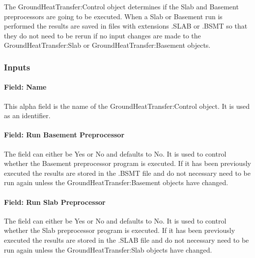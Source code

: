The GroundHeatTransfer:Control object determines if the Slab and Basement preprocessors are going to be executed. When a Slab or Basement run is performed the results are saved in files with extensions .SLAB or .BSMT so that they do not need to be rerun if no input changes are made to the GroundHeatTransfer:Slab or GroundHeatTransfer:Basement objects.

\subsubsection{Inputs}\label{inputs-013}

\paragraph{Field: Name}\label{field-name-012}

This alpha field is the name of the GroundHeatTransfer:Control object. It is used as an identifier.

\paragraph{Field: Run Basement Preprocessor}\label{field-run-basement-preprocessor}

The field can either be Yes or No and defaults to No. It is used to control whether the Basement preprocessor program is executed. If it has been previously executed the results are stored in the .BSMT file and do not necessary need to be run again unless the GroundHeatTransfer:Basement objects have changed.

\paragraph{Field: Run Slab Preprocessor}\label{field-run-slab-preprocessor}

The field can either be Yes or No and defaults to No. It is used to control whether the Slab preprocessor program is executed. If it has been previously executed the results are stored in the .SLAB file and do not necessary need to be run again unless the GroundHeatTransfer:Slab objects have changed.
